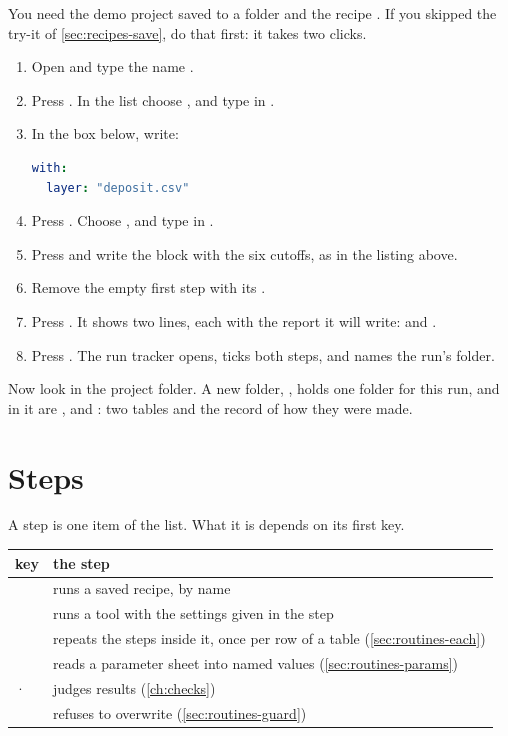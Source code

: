 \begin{tryit}
You need the demo project saved to a folder and the recipe . If you skipped the try-it of \cref{sec:recipes-save}, do that first: it takes two clicks.
\begin{enumerate}
\item Open  and type the name .
\item Press . In the  list choose , and type  in .
\item In the box below, write:
\begin{lstlisting}[language=yaml]
with:
  layer: "deposit.csv"
\end{lstlisting}
\item Press . Choose , and type  in .
\item Press  and write the  block with the six cutoffs, as in the listing above.
\item Remove the empty first step with its .
\item Press . It shows two lines, each with the report it will write:  and .
\item Press . The run tracker opens, ticks both steps, and names the run's folder.
\end{enumerate}
\end{tryit}

Now look in the project folder. A new folder, , holds one folder for this run, and in it are ,  and : two tables and the record of how they were made.

\section{Steps}\label{sec:routines-steps}
A step is one item of the  list. What it is depends on its first key.

\begin{tabularx}{\linewidth}{@{}lL@{}}\toprule
key & the step \\ \midrule
{} & runs a saved recipe, by name \\
 & runs a tool with the settings given in the step \\
 & repeats the steps inside it, once per row of a table (\cref{sec:routines-each}) \\
 & reads a parameter sheet into named values (\cref{sec:routines-params}) \\
 ·  & judges results (\cref{ch:checks}) \\
 & refuses to overwrite (\cref{sec:routines-guard}) \\
\bottomrule
\end{tabularx}

